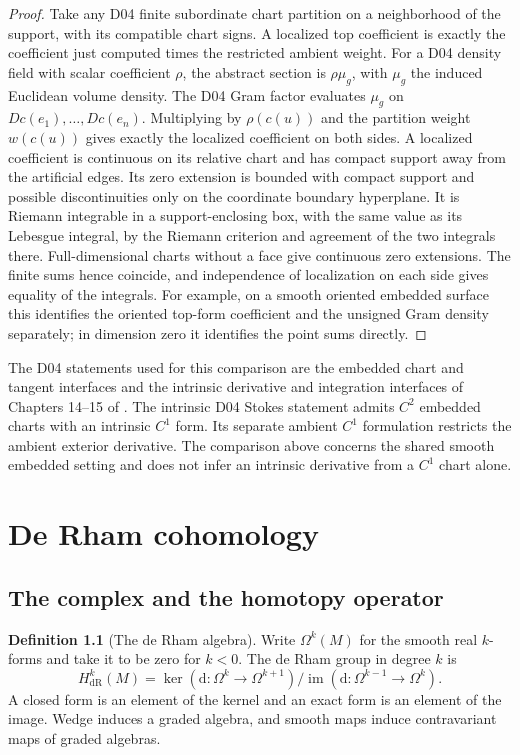 \documentclass[11pt,oneside,openany]{book}
\theoremstyle{definition}
\newtheorem{definition}[theorem]{Definition}
\theoremstyle{remark}
\newcommand{\dd}{\mathrm d}
\begin{document}
\begin{proof}
Take any D04 finite subordinate chart partition on a neighborhood
of the support, with its compatible chart signs. A localized
top coefficient is exactly the coefficient just computed times
the restricted ambient weight. For a D04 density field with
scalar coefficient \(\rho\), the abstract section is
\(\rho\mu_g\), with \(\mu_g\) the induced Euclidean volume
density. The D04 Gram factor evaluates \(\mu_g\) on
\(Dc(e_1),\ldots,Dc(e_n)\). Multiplying by \(\rho(c(u))\)
and the partition weight \(w(c(u))\) gives exactly the
localized coefficient on both sides. A
localized coefficient is continuous on its relative chart and
has compact support away from the artificial edges. Its zero
extension is bounded with compact support and possible
discontinuities only on the coordinate boundary hyperplane.
It is Riemann integrable in a support-enclosing box, with the
same value as its Lebesgue integral, by the Riemann criterion
and agreement of the two integrals there. Full-dimensional
charts without a face give continuous zero extensions.
The finite sums hence coincide, and independence of localization
on each side gives equality of the integrals. For example, on a
smooth oriented embedded surface this identifies the oriented
top-form coefficient and the unsigned Gram density separately;
in dimension zero it identifies the point sums directly.
\end{proof}

The D04 statements used for this comparison are the embedded
chart and tangent interfaces and the intrinsic derivative and
integration interfaces of Chapters 14--15 of \cite{d04}.
The intrinsic D04 Stokes statement admits \(C^2\) embedded charts
with an intrinsic \(C^1\) form. Its separate ambient \(C^1\)
formulation restricts the ambient exterior derivative. The
comparison above concerns the shared smooth embedded setting
and does not infer an intrinsic derivative from a \(C^1\)
chart alone.
\chapter{De Rham cohomology}

\section{The complex and the homotopy operator}

\begin{definition}[The de Rham algebra]
\label{p104:M11.01}
Write \(\Omega^k(M)\) for the smooth real \(k\)-forms and take it to
be zero for \(k<0\). The de Rham group in degree \(k\) is
\[
 H^k_{\mathrm{dR}}(M)
    =\ker(\dd:\Omega^k\to\Omega^{k+1})/
      \operatorname{im}(\dd:\Omega^{k-1}\to\Omega^k).
\]
A closed form is an element of the kernel and an exact form is an
element of the image. Wedge induces a graded algebra, and smooth
maps induce contravariant maps of graded algebras.
\end{definition}
\end{document}

